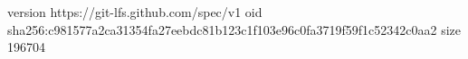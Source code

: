 version https://git-lfs.github.com/spec/v1
oid sha256:c981577a2ca31354fa27eebdc81b123c1f103e96c0fa3719f59f1c52342c0aa2
size 196704
